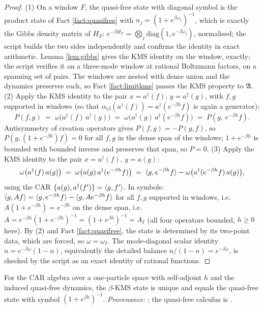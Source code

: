 \begin{proof}
(1) On a window $F$, the quasi-free state with diagonal symbol is the product state of Fact \ref{fact:quasifree} with $n_j = (1 + e^{\beta\omega_j})^{-1}$, which is exactly the Gibbs density matrix of $H_F$: $e^{-\beta H_F} = \bigotimes_j \mathrm{diag}(1, e^{-\beta\omega_j})$, normalised; the script builds the two sides independently and confirms the identity in exact arithmetic. Lemma \ref{lem:gibbs} gives the KMS identity on the window, exactly; the script verifies it on a three-mode window at rational Boltzmann factors, on a spanning set of pairs. The windows are nested with dense union and the dynamics preserves each, so Fact \ref{fact:limitkms} passes the KMS property to $\mathfrak{A}$.
(2) Apply the KMS identity to the pair $x = a^\dagger(f)$, $y = a^\dagger(g)$, with $f, g$ supported in windows (so that $\alpha_{i\beta}(a^\dagger(f)) = a^\dagger(e^{-\beta h}f)$ is again a generator):
\[
P(f, g) \;=\; \omega\bigl(a^\dagger(f)\,a^\dagger(g)\bigr) \;=\; \omega\bigl(a^\dagger(g)\,a^\dagger(e^{-\beta h}f)\bigr) \;=\; P(g,\, e^{-\beta h}f).
\]
Antisymmetry of creation operators gives $P(f, g) = -P(g, f)$, so $P(g, (1 + e^{-\beta h})f) = 0$ for all $f, g$ in the dense span of the windows; $1 + e^{-\beta h}$ is bounded with bounded inverse and preserves that span, so $P = 0$.
(3) Apply the KMS identity to the pair $x = a^\dagger(f)$, $y = a(g)$:
\[
\omega\bigl(a^\dagger(f)\,a(g)\bigr) \;=\; \omega\bigl(a(g)\,a^\dagger(e^{-\beta h}f)\bigr)
\;=\; \langle g, e^{-\beta h}f\rangle - \omega\bigl(a^\dagger(e^{-\beta h}f)\,a(g)\bigr),
\]
using the CAR $\{a(g), a^\dagger(f')\} = \langle g, f'\rangle$. In symbols: $\langle g, Af\rangle = \langle g, e^{-\beta h}f\rangle - \langle g, Ae^{-\beta h}f\rangle$ for all $f, g$ supported in windows, i.e.\ $A(1 + e^{-\beta h}) = e^{-\beta h}$ on the dense span, i.e.\ $A = e^{-\beta h}(1+e^{-\beta h})^{-1} = (1 + e^{\beta h})^{-1} = A_I$ (all four operators bounded, $h \ge 0$ here). By (2) and Fact \ref{fact:quasifree}, the state is determined by its two-point data, which are forced, so $\omega = \omega_I$. The mode-diagonal scalar identity $n = e^{-\beta\omega}(1-n)$, equivalently the detailed balance $n/(1-n) = e^{-\beta\omega}$, is checked by the script as an exact identity of rational functions.
\end{proof}

\begin{fact}\label{fact:fermigas}
For the CAR algebra over a one-particle space with self-adjoint $h$ and the induced quasi-free dynamics, the $\beta$-KMS state is unique and equals the quasi-free state with symbol $(1 + e^{\beta h})^{-1}$. \emph{Provenance:} \cite[Ex.~5.3.2 and \S 5.3]{BratteliRobinson1997}; the quasi-free calculus is \cite{Araki1971}.
\end{fact}

